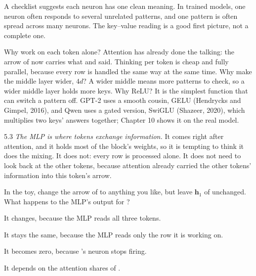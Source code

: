 \begin{breaks}
A checklist suggests each neuron has one clean meaning. In trained models, one neuron often responds to
several unrelated patterns, and one pattern is often spread across many neurons. The key--value reading is a
good first picture, not a complete one.
\end{breaks}

\Why Why work on each token alone? Attention has already done the talking: the arrow of  now
carries what  and  said. Thinking per token is cheap and fully parallel, because every row
is handled the same way at the same time. Why make the middle layer wider, $4d$? A wider middle means more
patterns to check, so a wider middle layer holds more keys. Why ReLU? It is the simplest function that can switch a pattern off. GPT-2 uses a
smooth cousin, GELU (Hendrycks and Gimpel, 2016), and Qwen uses a gated version, SwiGLU (Shazeer, 2020),
which multiplies two keys' answers together; Chapter 10 shows it on the real model.

\begin{wrongidea}{5.3}
\emph{The MLP is where tokens exchange information.} It comes right after attention, and it holds most of the
block's weights, so it is tempting to think it does the mixing. It does not: every row is processed alone.
It does not need to look back at the other tokens, because attention already carried the other tokens' information into this token's arrow.
\end{wrongidea}

\begin{checkq}
In the toy, change the arrow of  to anything you like, but leave $\bm{h}_{1}$ of 
unchanged. What happens to the MLP's output for ?
\begin{options}
\item It changes, because the MLP reads all three tokens.
\item It stays the same, because the MLP reads only the row it is working on.
\item It becomes zero, because 's neuron stops firing.
\item It depends on the attention shares of .
\end{options}
\end{checkq}


